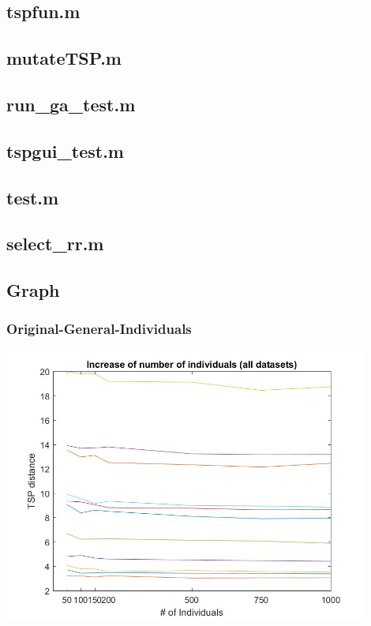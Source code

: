 \subsection{tspfun.m}

\subsection{mutateTSP.m}


\subsection{run\_ga\_test.m}

\subsection{tspgui\_test.m}

\subsection{test.m}

\subsection{select\_rr.m}



\subsection{Graph}
\subsubsection{Original-General-Individuals}
\begin{center}
\includegraphics[width=12cm]{img/xalt_edges/numberIndiv.jpg}
\end{center}
